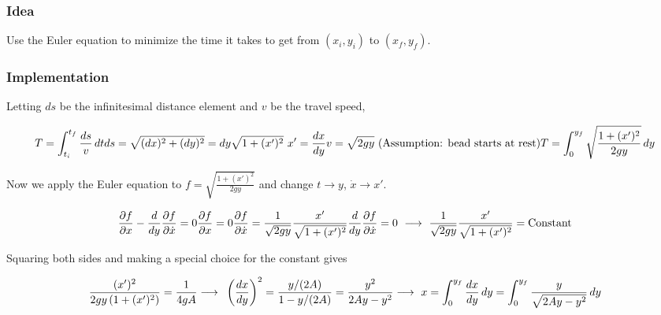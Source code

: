 \documentclass{article}
\begin{document}
\subsubsection*{Idea}

Use the Euler equation to minimize the time it takes to get from \(\left(x_i,y_i\right)\) to \(\left(x_f,y_f\right)\).

\subsubsection*{Implementation}

Letting \(ds\) be the infinitesimal distance element and \(v\) be the travel speed,

\[T=\int_{t_i}^{t_f} \frac{ds}{v} \, dt\\
\\
ds=\sqrt{(dx)^2+(dy)^2}=dy\sqrt{1+(x')^2}\text{             }x'=\frac{dx}{dy}\\
\\
v=\sqrt{2g y}\text{             }\text{(Assumption: bead starts at rest)}\\
\\
T=\int_0^{y_f} \sqrt{\frac{1+(x')^2}{2g y}} \, dy\]

Now we apply the Euler equation to \(f=\sqrt{\frac{1+(x')^2}{2g y}}\) and change \(t\to y\), \(\dot{x}\to x'\).

\[\frac{\partial f}{\partial x}-\frac{d}{dy} \frac{\partial f}{\partial \dot{x}}=0\\
\\
\frac{\partial f}{\partial x}=0\\
\\
 \frac{\partial f}{\partial \dot{x}}=\frac{1}{\sqrt{2g y}}\frac{x'}{\sqrt{1+(x')^2}}\\
\\
\frac{d}{dy} \frac{\partial f}{\partial \dot{x}}=0\text{   }\longrightarrow \text{   }\frac{1}{\sqrt{2g y}}\frac{x'}{\sqrt{1+(x')^2}}=\text{Constant}\]

Squaring both sides and making a special choice for the constant gives

\[\frac{(x')^2}{2g y\left(1+(x')^2\right)}=\frac{1}{4 g A}\\
\\
\longrightarrow \text{     }\left(\frac{dx}{dy}\right)^2=\frac{y/(2A)}{1-y/(2A)}=\frac{y^2}{2 A y-y^2}\\
\\
\longrightarrow \text{     }x=\int_0^{y_f} \frac{dx}{dy} \, dy=\int_0^{y_f} \frac{y}{\sqrt{2 A y-y^2}} \, dy\]
\end{document}
